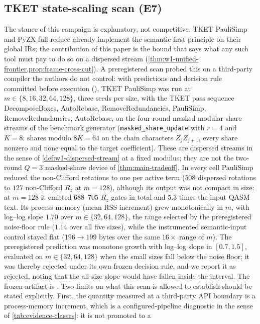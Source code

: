 \subsection{TKET state-scaling scan (E7)}
The stance of this campaign is explanatory, not competitive.  TKET
PauliSimp and PyZX full-reduce already implement the semantic-first
principle on their global IRs; the contribution of this paper is the
bound that says what any such tool must pay to do so on a dispersed
stream (\cref{thm:w1-unified-frontier,prop:frame-cross-cut}).  A preregistered scan probed
this on a third-party compiler the authors do not control: with
predictions and decision rule committed before execution
(), TKET PauliSimp was
run at $m\in\{8,16,32,64,128\}$, three seeds per size, with the TKET
pass sequence DecomposeBoxes, AutoRebase, RemoveRedundancies, PauliSimp,
RemoveRedundancies, AutoRebase, on the four-round
masked modular-share streams of the benchmark generator
(\texttt{masked\_share\_update} with $r=4$ and $K=8$: shares modulo
$8K=64$ on the chain characters $Z_jZ_{j+1}$, every share nonzero and
none equal to the target coefficient).  These are dispersed streams in
the sense of \cref{def:w1-dispersed-stream} at a fixed modulus; they are
not the two-round $Q=3$ masked-share device of \cref{thm:main-tradeoff}.
In every cell PauliSimp reduced the non-Clifford rotations to one per
active term ($508$ dispersed rotations to $127$ non-Clifford $R_z$ at
$m=128$), although its output was not compact in size: at $m=128$ it
emitted $688$--$705$ $R_z$ gates in total and $5.3$ times the input
QASM text.  Its process memory (mean RSS increment) grew monotonically
in $m$, with log--log slope $1.70$ over $m\in\{32,64,128\}$, the range
selected by the preregistered noise-floor rule ($1.14$ over all five
sizes), while the instrumented semantic-input control stayed flat
($196\to199$ bytes over the same $16\times$ range of $m$).  The
preregistered prediction was monotone growth with log--log slope in
$[0.7,1.5]$, evaluated on $m\in\{32,64,128\}$ when the small sizes fall
below the noise floor; it was thereby rejected under its own frozen
decision rule, and we report it as rejected, noting that the all-size
slope would have fallen inside the interval.  The frozen artifact is
.  Two limits on what this
scan is allowed to establish should be stated explicitly.  First, the
quantity measured at a third-party API boundary is a process-memory
increment, which is a configured-pipeline diagnostic in
the sense of \cref{tab:evidence-classes}: it is not promoted to a
